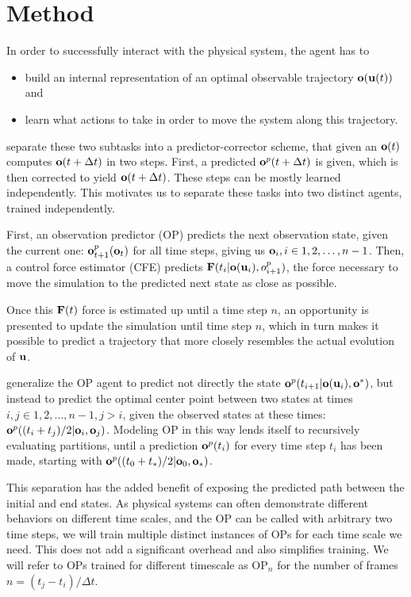 \documentclass[acmtog]{techreportacmart}
\begin{document}
\section{Method}

In order to successfully interact with the physical system, the agent has to 
\begin{itemize}
  \item build an internal representation of an optimal observable trajectory
    $\vb{o}(\vb{u}(t))$ and
  \item learn what actions to take in order to move the system along this
    trajectory.
\end{itemize}

\cite{ControlPDEs} separate these two subtasks into a predictor-corrector
scheme, that given an $\vb{o}(t)$ computes $\vb{o}(t + \Delta t)$  in two steps.
First, a predicted $\vb{o}^p(t+\Delta t)$ is given, which is then corrected to
yield $\vb{o}(t+\Delta t)$. These steps can be mostly learned independently.
This motivates us to separate these tasks into two distinct agents, trained
independently.

First, an observation predictor (OP) predicts the next observation state, given
the current one: $\vb{o}_{t+1}^p(\vb{o}_t)$ for all time steps, giving us
$\vb{o}_i, i \in {1,2,\dots, n-1}$. Then, a control force estimator (CFE)
predicts $\vb{F}(t_i |\vb{o}(\vb{u}_i), o^p_{i+1} )$, the force necessary to
move the simulation to the predicted next state as close as possible.

Once this $\vb{F}(t)$ force is estimated up until a time step $n$, an
opportunity is presented to update the simulation until time step $n$, which in
turn makes it possible to predict a trajectory that more closely resembles the
actual evolution of $\vb{u}$. 

\cite{ControlPDEs} generalize the OP agent to predict not directly the state
$\vb{o}^p(t_{i+1} | \vb{o}(\vb{u}_i), \vb{o}^*)$, but instead to predict the
optimal center point between two states at times 
$i, j \in {1,2,\dots,n-1}, j > i$, given the observed states at these times: 
$\vb{o}^p((t_i + t_j)/2 | \vb{o}_i, \vb{o}_j)$. Modeling OP in this way lends
itself to recursively evaluating partitions, until a prediction $\vb{o}^p(t_i)$
for every time step $t_i$ has been made, starting with 
$\vb{o}^p((t_0 + t_*)/2 | \vb{o}_0, \vb{o}_*)$.

This separation has the added benefit of exposing the predicted path between the
initial and end states. As physical systems can often demonstrate different
behaviors on different time scales, and the OP can be called with arbitrary two
time steps, we will train multiple distinct instances of OPs for each time
scale we need. This does not add a significant overhead and also simplifies
training. We will refer to OPs trained for different timescale as OP$_n$ for the
number of frames $n = (t_j - t_i)/ \Delta t$.
\end{document}
